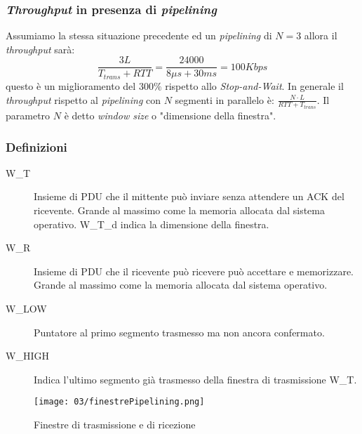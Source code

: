         \subsubsection{\textit{Throughput} in presenza di \textit{pipelining}}
            Assumiamo la stessa situazione precedente ed un \textit{pipelining} di $ N = 3 $ allora il \textit{throughput} sarà: $$ \frac{3L}{T_{trans}+RTT} = \frac{24000}{8\mu s + 30ms} = 100 Kbps $$questo è un miglioramento del $ 300\% $ rispetto allo \textit{Stop-and-Wait}. In generale il \textit{throughput} rispetto al \textit{pipelining} con $ N $ segmenti in parallelo è: $ \frac{N \cdot L}{RTT + T_{trans}} $. Il parametro $ N $ è detto \textit{window size} o "dimensione della finestra".
        \subsubsection{Definizioni}
            \begin{description}
                \item[\Acrfull*{W_T}] Insieme di \Acrshort*{PDU} che il mittente può inviare senza attendere un \Acrshort*{ACK} del ricevente.
                    \subitem Grande al massimo come la memoria allocata dal sistema operativo.
                    \subitem \Acrshort*{W_T_d} indica la dimensione della finestra.
                \item[\Acrfull*{W_R}] Insieme di \Acrshort*{PDU} che il ricevente può ricevere può accettare e memorizzare.
                    \subitem Grande al massimo come la memoria allocata dal sistema operativo.
                \item[\Acrfull*{W_LOW}] Puntatore al primo segmento trasmesso ma non ancora confermato.
                \item[\Acrfull*{W_HIGH}] Indica l'ultimo segmento già trasmesso della finestra di trasmissione \Acrshort*{W_T}.
            \end{description}
        
        \begin{figure}[H]
            \centering
            \texttt{[image: 03/finestrePipelining.png]}
            \caption{Finestre di trasmissione e di ricezione}
        \end{figure}
